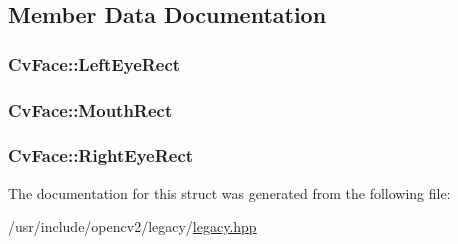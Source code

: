 \subsection{Member Data Documentation}
\hypertarget{structCvFace_a1552b64b4ff72137d3b3a3f31d87c315}{
\subsubsection[{Left\-Eye\-Rect}]{ Cv\-Face\-::\-Left\-Eye\-Rect}}\label{structCvFace_a1552b64b4ff72137d3b3a3f31d87c315}
\hypertarget{structCvFace_af9e59f64d8b4ff74be6481ee4a6eda0b}{
\subsubsection[{Mouth\-Rect}]{ Cv\-Face\-::\-Mouth\-Rect}}\label{structCvFace_af9e59f64d8b4ff74be6481ee4a6eda0b}
\hypertarget{structCvFace_ae39fc3ffa37e59363fc3c2bf81d80b06}{
\subsubsection[{Right\-Eye\-Rect}]{ Cv\-Face\-::\-Right\-Eye\-Rect}}\label{structCvFace_ae39fc3ffa37e59363fc3c2bf81d80b06}


The documentation for this struct was generated from the following file\-:\begin{DoxyCompactItemize}
\item 
/usr/include/opencv2/legacy/\hyperlink{legacy_8hpp}{legacy.\-hpp}\end{DoxyCompactItemize}
